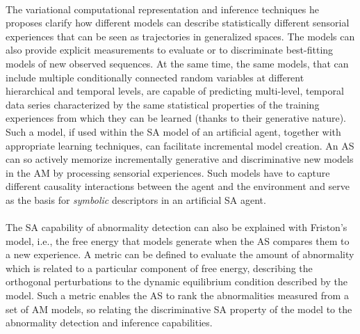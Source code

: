 \documentclass{article}
\begin{document}
		\paragraph{} The variational computational representation and inference
		techniques he proposes clarify how different models can
		describe statistically different sensorial experiences that can
		be seen as trajectories in generalized spaces. The models
		can also provide explicit measurements to evaluate or to
		discriminate best-fitting models of new observed sequences.
		At the same time, the same models, that can include multiple conditionally connected random variables at different
		hierarchical and temporal levels, are capable of predicting
		multi-level, temporal data series characterized by the same
		statistical properties of the training experiences from which
		they can be learned (thanks to their generative nature). Such
		a model, if used within the SA model of an artificial agent,
		together with appropriate learning techniques, can facilitate
		incremental model creation. An AS can so actively memorize
		incrementally generative and discriminative new models in the
		AM by processing sensorial experiences. Such models have to
		capture different causality interactions between the agent and
		the environment and serve as the basis for \emph{symbolic} descriptors
		in an artificial SA agent.
		\paragraph{} The SA capability of abnormality detection can also be
		explained with Friston’s model, i.e., the free energy that
		models generate when the AS compares them to a new
		experience. A metric can be defined to evaluate the amount
		of abnormality which is related to a particular component
		of free energy, describing the orthogonal perturbations to the
		dynamic equilibrium condition described by the model. Such
		a metric enables the AS to rank the abnormalities measured
		from a set of AM models, so relating the discriminative
		SA property of the model to the abnormality detection and
		inference capabilities.
\end{document}
